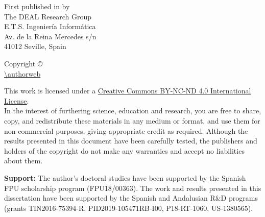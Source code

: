 \cleardoublepage

\noindent First published in \monthyeardate{} by\\
The DEAL Research Group\\
E.T.S. Ingeniería Informática\\
Av. de la Reina Mercedes s/n\\
41012 Seville, Spain

\vspace{.5cm}
\noindent Copyright \copyright{} \romanyear \autor\\
\url{\authorweb}\\
\href{mailto:\authormail}{\texttt{\authormail}}

\vspace{.5cm}

\noindent This work is licensed under a \href{http://creativecommons.org/licenses/by-nc-nd/4.0}{Creative Commons BY-NC-ND 4.0 International License}.\\
In the interest of furthering science, education and research, you are free to share, copy, and redistribute these materials in any medium or format, and use them for non-commercial purposes, giving appropriate credit as required. Although the results presented in this document have been carefully tested, the publishers and holders of the copyright do not make any warranties and accept no liabilities about them.

\vspace{10cm}

\noindent \textbf{Support:} The author's doctoral studies have been supported by the Spanish FPU scholarship program (FPU18/00363). The work and results presented in this dissertation have been supported by the Spanish and Andalusian R\&D programs (grants TIN2016-75394-R, PID2019-105471RB-I00, P18-RT-1060, US-1380565).
